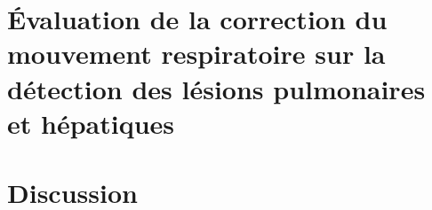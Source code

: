 \documentclass[12pt, a4paper]{book}
\begin{document}
\part{\'Evaluation de la correction du mouvement respiratoire sur la détection des lésions pulmonaires et hépatiques}
	

\part{Discussion}
	


\newpage
{}





\newpage



\newpage

\newpage

\end{document}
